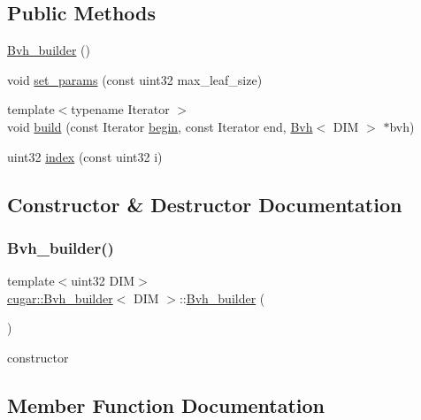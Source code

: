 \subsection*{Public Methods}
\begin{DoxyCompactItemize}
\item 
\hyperlink{classcugar_1_1_bvh__builder_a298adf654253d0bcf55c903e1d2b7519}{Bvh\+\_\+builder} ()
\item 
void \hyperlink{classcugar_1_1_bvh__builder_a5de1e0c569c991a51e69e5d45abae979}{set\+\_\+params} (const uint32 max\+\_\+leaf\+\_\+size)
\item 
{\footnotesize template$<$typename Iterator $>$ }\\void \hyperlink{classcugar_1_1_bvh__builder_a7f72eef58c9e1352bec8129809aceeb9}{build} (const Iterator \hyperlink{namespacecugar_a2121df08f967e232ea5fe0ee378dee67}{begin}, const Iterator end, \hyperlink{structcugar_1_1_bvh}{Bvh}$<$ D\+IM $>$ $\ast$bvh)
\item 
uint32 \hyperlink{classcugar_1_1_bvh__builder_a393d93f26b616c0fb97e0267a421e99b}{index} (const uint32 i)
\end{DoxyCompactItemize}


\subsection{Constructor \& Destructor Documentation}
\mbox{\label{classcugar_1_1_bvh__builder_a298adf654253d0bcf55c903e1d2b7519}} 
\subsubsection{\texorpdfstring{Bvh\+\_\+builder()}{Bvh\_builder()}}
{\footnotesize\ttfamily template$<$uint32 D\+IM$>$ \\
\hyperlink{classcugar_1_1_bvh__builder}{cugar\+::\+Bvh\+\_\+builder}$<$ D\+IM $>$\+::\hyperlink{classcugar_1_1_bvh__builder}{Bvh\+\_\+builder} (\begin{DoxyParamCaption}{ }\end{DoxyParamCaption})\hspace{0.3cm}{\ttfamily [inline]}}

constructor 

\subsection{Member Function Documentation}
\mbox{\label{classcugar_1_1_bvh__builder_a7f72eef58c9e1352bec8129809aceeb9}} 
